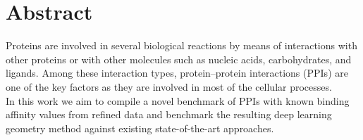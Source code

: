 \section{Abstract}
Proteins are involved in several biological reactions by means of interactions with other proteins or
with other molecules such as nucleic acids, carbohydrates, and ligands. Among these interaction
types, protein–protein interactions (PPIs) are one of the key factors as they are
involved in most of the cellular processes. \\
In this work we aim to compile a novel benchmark of PPIs with known binding affinity values from refined data and benchmark the resulting deep learning geometry method against existing state-of-the-art approaches.